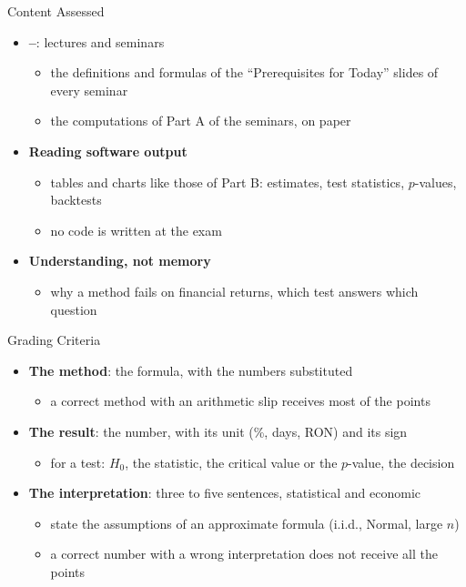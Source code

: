 \begin{frame}{Content Assessed}
\itemsize{\small}
\begin{itemize}
    \item \textbf{--}: lectures and seminars
    \begin{itemize}
        \item the definitions and formulas of the ``Prerequisites for Today'' slides of every seminar
        \item the computations of Part A of the seminars, on paper
    \end{itemize}
    \item \textbf{Reading software output}
    \begin{itemize}
        \item tables and charts like those of Part B: estimates, test statistics, $p$-values, backtests
        \item no code is written at the exam
    \end{itemize}
    \item \textbf{Understanding, not memory}
    \begin{itemize}
        \item why a method fails on financial returns, which test answers which question
    \end{itemize}
\end{itemize}
\end{frame}

\begin{frame}{Grading Criteria}
\itemsize{\small}
\begin{itemize}
    \item \textbf{The method}: the formula, with the numbers substituted
    \begin{itemize}
        \item a correct method with an arithmetic slip receives most of the points
    \end{itemize}
    \item \textbf{The result}: the number, with its unit (\%, days, RON) and its sign
    \begin{itemize}
        \item for a test: $H_0$, the statistic, the critical value or the $p$-value, the decision
    \end{itemize}
    \item \textbf{The interpretation}: three to five sentences, statistical and economic
    \begin{itemize}
        \item state the assumptions of an approximate formula (i.i.d., Normal, large $n$)
        \item a correct number with a wrong interpretation does not receive all the points
    \end{itemize}
\end{itemize}
\end{frame}

